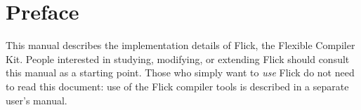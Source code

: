 


\chapter*{Preface}
\label{cha:Preface}

This manual describes the implementation details of Flick, the Flexible \IDL{}
Compiler Kit.  People interested in studying, modifying, or extending Flick
should consult this manual as a starting point.  Those who simply want to
\emph{use} Flick do not need to read this document: use of the Flick compiler
tools is described in a separate user's manual.





